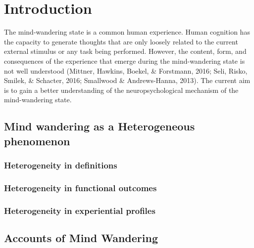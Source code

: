 \chapter{Introduction}
\label{ch:intro}

\newpage

The mind-wandering state is a common human experience. Human cognition has the capacity to generate thoughts that are only loosely related to the current external stimulus or any task being performed. However, the content, form, and consequences of the experience that emerge during the mind-wandering state is not well understood (Mittner, Hawkins, Boekel, \& Forstmann, 2016; Seli, Risko, Smilek, \& Schacter, 2016; Smallwood \& Andrews-Hanna, 2013). The current aim is to gain a better understanding of the neuropsychological mechanism of the mind-wandering state.


\section{Mind wandering as a Heterogeneous phenomenon}

\subsection{Heterogeneity in definitions}

\subsection{Heterogeneity in functional outcomes}

\subsection{Heterogeneity in experiential profiles }


\section{Accounts of Mind Wandering}

